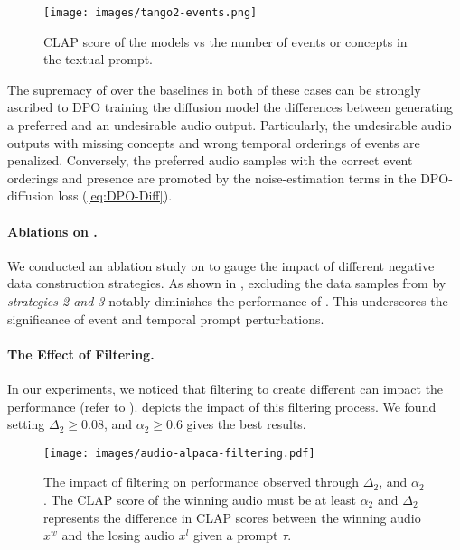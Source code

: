 \begin{figure}[t]
    \centering
    \texttt{[image: images/tango2-events.png]}
    \caption{CLAP score of the models vs the number of events or concepts in the textual prompt.
    }
    \label{fig:event-analysis}
\end{figure}
The supremacy of \model{} over the baselines in both of these cases can be strongly ascribed to DPO training the diffusion model the differences between generating a preferred and an undesirable audio output. Particularly, the undesirable audio outputs with missing concepts and wrong temporal orderings of events are penalized. Conversely, the preferred audio samples with the correct event orderings and presence are promoted by the noise-estimation terms in the DPO-diffusion loss (\cref{eq:DPO-Diff}).

\paragraph{\bf Ablations on \dataset{}.} We conducted an ablation study on \dataset{} to gauge the impact of different negative data construction strategies. As shown in , excluding the data samples from by \emph{strategies 2 and 3} notably diminishes the performance of \model{}. This underscores the significance of event and temporal prompt perturbations.

\paragraph{\bf The Effect of Filtering.}
In our experiments, we noticed that filtering to create different \dataset{} can impact the performance (refer to ).   depicts the impact of this filtering process. We found setting $\Delta_2 \ge 0.08$, and $\alpha_2 \ge 0.6$ gives the best results. 
\begin{figure}
    \centering
    \texttt{[image: images/audio-alpaca-filtering.pdf]}
    \caption{The impact of filtering \dataset{} on performance observed through $\Delta_2$, and $\alpha_2$. The CLAP score of the winning audio must be at least $\alpha_2$ and $\Delta_2$ represents the difference in CLAP scores between the winning audio $x^w$ and the losing audio $x^l$ given a prompt $\tau$. %
    }
    \label{fig:filtering}
\end{figure}

